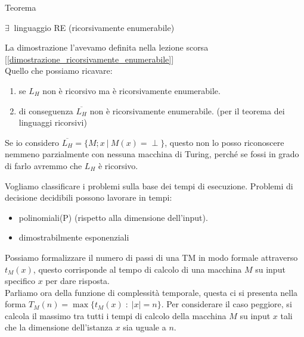 \begin{teorema}{Teorema}{}
\par
$\exists \ $ linguaggio RE (ricorsivamente enumerabile)
\end{teorema}
La dimostrazione l'avevamo definita nella lezione scorsa  [\ref{dimostrazione_ricorsivamente_enumerabile}]\\ 
Quello che possiamo ricavare:
\begin{enumerate}
    \item se $L_H$ non è ricorsivo ma è ricorsivamente enumerabile.
    \item di conseguenza  $\overline{L_H}$ non è ricorsivamente enumerabile. (per il teorema dei linguaggi ricorsivi)
\end{enumerate}
Se io considero $\overline{L_H} = \{M;x\  | \ M(x) = \perp \}$, questo non lo posso riconoscere nemmeno parzialmente con nessuna macchina di Turing, perché se fossi in grado di farlo avremmo che $L_H$ è ricorsivo. 

Vogliamo classificare i problemi sulla base dei tempi di esecuzione. Problemi di decisione decidibili possono lavorare in tempi:
\begin{itemize}
    \item polinomiali(P) (rispetto alla dimensione dell'input).
    \item dimostrabilmente esponenziali
\end{itemize}
Possiamo formalizzare il numero di passi di una TM in modo formale attraverso $t_M(x)$, questo corrisponde al tempo di calcolo di una macchina $M$ su input specifico $x$ per dare risposta.\\
Parliamo ora della funzione di complessità temporale, questa ci si presenta nella forma $T_M(n) = \max\{t_M(x) \; : \; |x|=n\}$. 
Per considerare il caso peggiore, si calcola il massimo tra tutti i tempi di calcolo della macchina $M$ su input $x$ tali che la dimensione dell’istanza $x$ sia uguale a $n$.\\

